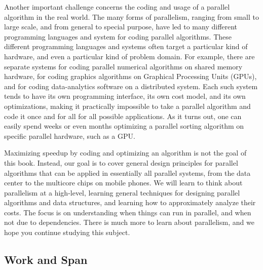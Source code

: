 Another important challenge concerns the coding and usage of a
parallel algorithm in the real world.
%
The many forms of parallelism, ranging from small to large scale, and
from general to special purpose, have led to many different programming
languages and system for coding parallel algorithms.
%
These different programming languages and systems often target a
particular kind of hardware, and even a particular kind of problem
domain.  
%
For example, there are separate systems for coding parallel numerical
algorithms on shared memory hardware, for coding graphics algorithms
on Graphical Processing Units (GPUs), and for coding data-analytics
software on a distributed system.
%
Each such system tends to have its own programming interface, its own
cost model, and its own optimizations, making it practically
impossible to take a parallel algorithm and code it once and for all
for all possible applications.
%
As it turns out, one can easily spend weeks or even months optimizing a
parallel sorting algorithm on specific parallel hardware, such as a GPU.



Maximizing speedup by coding and optimizing an algorithm is not the
goal of this book.
%
Instead, our goal is to cover general design principles for parallel
algorithms that can be applied in essentially all parallel systems,
from the data center to the multicore chips on mobile phones.
%
We will learn to think about parallelism at a high-level, learning
general techniques for designing parallel algorithms and data
structures, and learning how to approximately analyze their costs.
%
The focus is on understanding when things can run in parallel, and
when not due to dependencies.  
%
There is much more to learn about parallelism, and we hope you
continue studying this subject.



\subsection{Work and Span}


